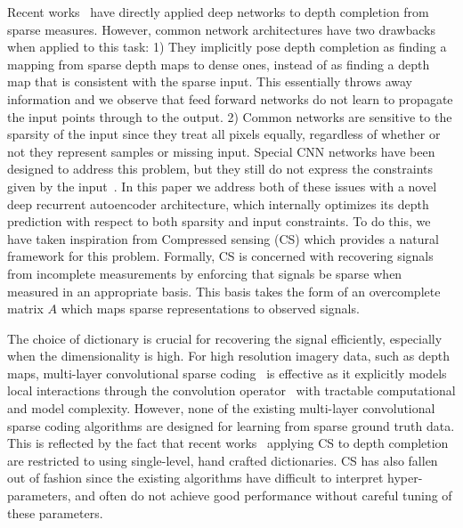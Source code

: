 Recent works~\cite{} have directly applied deep networks to depth completion from sparse measures. However, common network architectures have two drawbacks when applied to this task: 1) They implicitly pose depth completion as finding a mapping from sparse depth maps to dense ones, instead of as finding a depth map that is consistent with the sparse input. This essentially throws away information and we observe that feed forward networks do not learn to propagate the input points through to the output. 2) Common networks are sensitive to the sparsity of the input since they treat all pixels equally, regardless of whether or not they represent samples or missing input. Special CNN networks have been designed to address this problem, but they still do not express the constraints given by the input~\cite{}. In this paper we address both of these issues with a novel deep recurrent autoencoder architecture, which internally optimizes its depth prediction with respect to both sparsity and input constraints.
To do this, we have taken inspiration from Compressed sensing (CS) which provides a natural framework for this problem. Formally, CS is concerned with recovering signals from incomplete measurements by enforcing that signals be sparse when measured in an appropriate basis. This basis takes the form of an overcomplete matrix $A$ which maps sparse representations to observed signals.

The choice of dictionary is crucial for recovering the signal efficiently, especially when the dimensionality is high. For high resolution imagery data, such as depth maps, multi-layer convolutional sparse coding~\cite{} is effective as it explicitly models local interactions through the convolution operator~\cite{} with tractable computational and model complexity. However, none of the existing multi-layer convolutional sparse coding algorithms are designed for learning from sparse ground truth data. This is reflected by the fact that recent works~\cite{} applying CS to depth completion are restricted to using single-level, hand crafted dictionaries. CS has also fallen out of fashion since the existing algorithms have difficult to interpret hyper-parameters, and often do not achieve good performance without careful tuning of these parameters.

